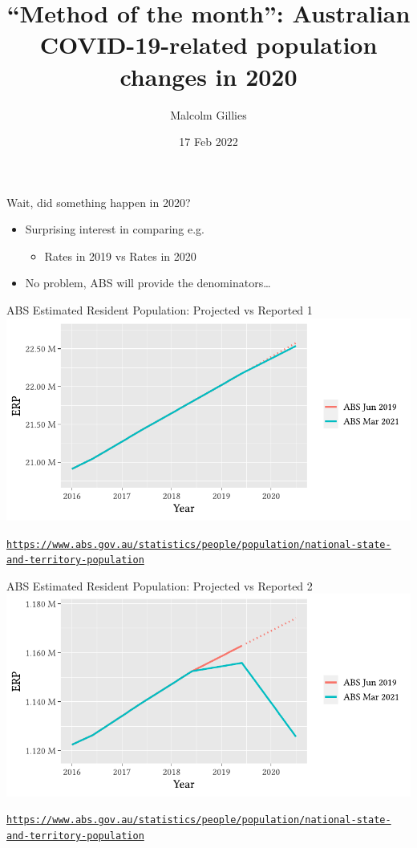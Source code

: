 \documentclass[aspectratio=169,12pt]{beamer} %
\title{``Method of the month'': Australian COVID-19-related population changes in 2020}
\author{Malcolm Gillies}
\date{17 Feb 2022}
\begin{document}
{
\begin{frame}
\titlepage
\end{frame}
}

\begin{frame}{Wait, did something happen in 2020?}
	\begin{itemize}
		\item Surprising interest in comparing e.g.
			\begin{itemize}
				\item Rates in 2019 vs Rates in 2020
			\end{itemize}
		\item No problem, ABS will provide the denominators\dots
	\end{itemize}
\end{frame}

\begin{frame}{ABS Estimated Resident Population: Projected vs Reported 1}
	\center\includegraphics[height=0.75\textheight]{ref/pops-overall.pdf}
	\begin{flushright}\tiny\texttt{\url{https://www.abs.gov.au/statistics/people/population/national-state-and-territory-population}}\end{flushright}
\end{frame}

\begin{frame}{ABS Estimated Resident Population: Projected vs Reported 2}
	\center\includegraphics[height=0.75\textheight]{ref/pops-f18-24.pdf}
	\begin{flushright}\tiny\texttt{\url{https://www.abs.gov.au/statistics/people/population/national-state-and-territory-population}}\end{flushright}
\end{frame}
\end{document}
